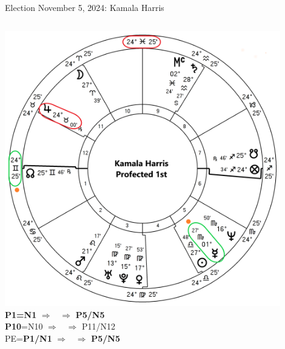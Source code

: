 \begin{frame}[t]{Election November 5, 2024: Kamala Harris}
\begin{columns}[T, onlytextwidth]
\vspace{-1em}
{\includegraphics[width=0.9\textwidth]{charts/Harris-Prof-1st.png}}
\fontsize{8pt}{9pt}\selectfont
\textbf{\dgreen P1=N1}
	$\Rightarrow$ \Mercury\, $\Rightarrow$ \textbf{\dgreen P5/N5}\\
\textbf{\red P10}=N10
	$\Rightarrow$ \Jupiter\, $\Rightarrow$ P11/N12\\
PE=\textbf{\dgreen P1/N1}
	 $\Rightarrow$ \Mercury\, $\Rightarrow$ \textbf{\dgreen P5/N5}

\end{columns}
\end{frame}
